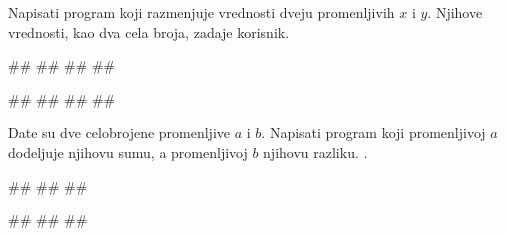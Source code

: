 

\begin{Exercise}[label=UZ_NI_08] 
Napisati program koji razmenjuje vrednosti dveju promenljivih $x$ i $y$. Njihove vrednosti, kao dva cela broja, zadaje korisnik.  

\begin{miditest}
\begin{upotreba}{1}
#\naslovInt#
##
##
##
\end{upotreba}
\end{miditest}
\begin{miditest}
\begin{upotreba}{2}
#\naslovInt#
##
##
##
\end{upotreba}
\end{miditest}

\end{Exercise}
\ifresenja
\begin{Answer}[ref=UZ_NI_08]
\end{Answer}
\fi


\begin{Exercise}[label=UZ_NI_09]
Date su dve celobrojene promenljive $a$ i $b$. Napisati program koji promenljivoj $a$ dodeljuje
njihovu sumu, a promenljivoj $b$ njihovu razliku. . 

\begin{miditest}
\begin{upotreba}{1}
#\naslovInt#
##
##
\end{upotreba}
\end{miditest}
\begin{miditest}
\begin{upotreba}{2}
#\naslovInt#
##
##
\end{upotreba}
\end{miditest}

\end{Exercise}
\ifresenja
\begin{Answer}[ref=UZ_NI_09]
\end{Answer}
\fi

